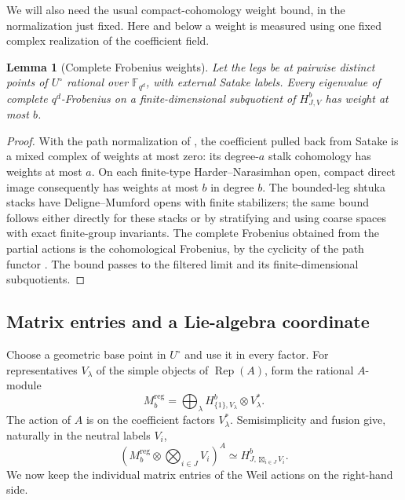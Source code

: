 \documentclass[11pt]{article}
\numberwithin{equation}{section}
\newtheorem{lemma}[theorem]{Lemma}
\theoremstyle{definition}
\theoremstyle{remark}
\newcommand{\F}{\mathbb F}
\newcommand{\Rep}{\operatorname{Rep}}
\begin{document}
We will also need the usual compact-cohomology weight bound, in the
normalization just fixed.  Here and below a weight is measured using
one fixed complex realization of the coefficient field.

\begin{lemma}[Complete Frobenius weights]\label{lem:glob-weights}
Let the legs be at pairwise distinct points of $U^\circ$ rational over
$\F_{q^d}$, with external Satake labels.  Every eigenvalue of complete
$q^d$-Frobenius on a finite-dimensional subquotient of $H^b_{J,V}$
has weight at most $b$.
\end{lemma}

\begin{proof}
With the path normalization of \cite[Section~2]{Parent}, the
coefficient pulled back from Satake is a mixed complex of weights at
most zero: its degree-$a$ stalk cohomology has weights at most $a$.
On each finite-type Harder--Narasimhan open, compact direct
image consequently has weights at most $b$ in degree $b$.  The
bounded-leg shtuka stacks have Deligne--Mumford opens with finite
stabilizers; the same bound follows either directly for these stacks
or by stratifying and using coarse spaces with exact finite-group
invariants.  The complete Frobenius obtained from the partial actions
is the cohomological Frobenius, by the cyclicity of the path functor
\cite[Section~2, Proposition ``Coherent path rotation'']{Parent}.
The bound passes to the filtered limit and its finite-dimensional
subquotients.
\end{proof}

\subsection{Matrix entries and a Lie-algebra coordinate}

Choose a geometric base point in $U^\circ$ and use it in every factor.
For representatives $V_\lambda$ of the simple objects of $\Rep(A)$,
form the rational $A$-module
\[
 M_b^{\mathrm{reg}}
   =\bigoplus_\lambda H^b_{\{1\},V_\lambda}\otimes V_\lambda^*.
\]
The action of $A$ is on the coefficient factors $V_\lambda^*$.
Semisimplicity and fusion give, naturally in the neutral labels $V_i$,
\begin{equation}\label{eq:regular-tests}
 \left(M_b^{\mathrm{reg}}\otimes\bigotimes_{i\in J}V_i\right)^A
       \simeq H^b_{J,\boxtimes_{i\in J}V_i}.
\end{equation}
We now keep the individual matrix entries of the Weil actions on the
right-hand side.
\end{document}
